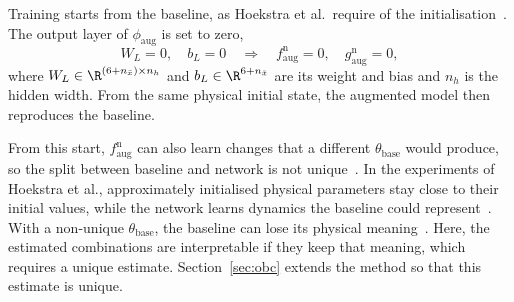 Training starts from the baseline, as Hoekstra et al.\ require of the
initialisation~\cite[Eq.~(29)]{hoekstra2026lfr}.
The output layer of $\phi_{\mathrm{aug}}$ is set to zero,
\begin{equation}
 W_L=0,\quad b_L=0
 \quad\Longrightarrow\quad
 f^{\mathrm n}_{\mathrm{aug}}=0,\quad g^{\mathrm n}_{\mathrm{aug}}=0,
 \label{eq:aug_zero_init}
\end{equation}
where $W_L\in\R^{(6+n_{\bar x})\times n_h}$ and $b_L\in\R^{6+n_{\bar x}}$ are
its weight and bias and $n_h$ is the hidden width.
From the same physical initial state, the augmented model then reproduces the
baseline.

From this start, $f^{\mathrm n}_{\mathrm{aug}}$ can also learn changes that a
different $\theta_{\mathrm{base}}$ would produce, so the split between
baseline and network is not unique~\cite[Sec.~5.2]{hoekstra2026lfr}.
In the experiments of Hoekstra et al., approximately initialised physical
parameters stay close to their initial values, while the network learns
dynamics the baseline could represent~\cite[Sec.~6.3]{hoekstra2026lfr}.
With a non-unique $\theta_{\mathrm{base}}$, the baseline can lose its physical
meaning~\cite[Sec.~3]{gyorok2026obc}.
Here, the estimated combinations are interpretable if they keep that meaning,
which requires a unique estimate.
Section~\ref{sec:obc} extends the method so that this estimate is unique.

